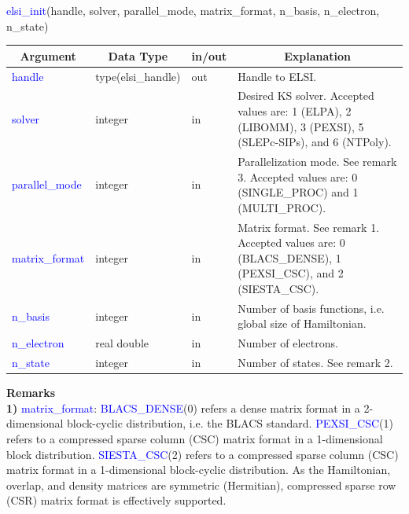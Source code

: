 \documentclass{report}
\begin{document}
\begin{labeling}{\hspace{6cm}}
\item [\hspace{0.3cm} \textcolor{blue}{elsi\_init}(handle, solver, parallel\_mode, matrix\_format, n\_basis, n\_electron, n\_state)]
\end{labeling}

\begin{tabular}[]{|p{30mm}|p{30mm}|p{15mm}|p{90mm}|}
\hline
\multicolumn{1}{|c|}{\textbf{Argument}} & \multicolumn{1}{c|}{\textbf{Data Type}} & \multicolumn{1}{c|}{\textbf{in/out}} & \multicolumn{1}{c|}{\textbf{Explanation}}\\
\hline
\textcolor{blue}{handle}         & type(elsi\_handle) & out & Handle to ELSI.\\
\hline
\textcolor{blue}{solver}         & integer            & in  & Desired KS solver.  Accepted values are:  1 (ELPA), 2 (LIBOMM), 3 (PEXSI), 5 (SLEPc-SIPs), and 6 (NTPoly).\\
\hline
\textcolor{blue}{parallel\_mode} & integer            & in  & Parallelization mode.  See remark 3.  Accepted values are:  0 (SINGLE\_PROC) and 1 (MULTI\_PROC).\\
\hline
\textcolor{blue}{matrix\_format} & integer            & in  & Matrix format.  See remark 1.  Accepted values are:  0 (BLACS\_DENSE), 1 (PEXSI\_CSC), and 2 (SIESTA\_CSC).\\
\hline
\textcolor{blue}{n\_basis}       & integer            & in  & Number of basis functions, i.e. global size of Hamiltonian.\\
\hline
\textcolor{blue}{n\_electron}    & real double        & in  & Number of electrons.\\
\hline
\textcolor{blue}{n\_state}       & integer            & in  & Number of states.  See remark 2.\\
\hline
\end{tabular}

\bigskip
\textbf{Remarks}\\

\textbf{1)} \textcolor{blue}{matrix\_format}:  \textcolor{blue}{BLACS\_DENSE}(0) refers a dense matrix format in a 2-dimensional block-cyclic distribution, i.e. the BLACS standard.  \textcolor{blue}{PEXSI\_CSC}(1) refers to a compressed sparse column (CSC) matrix format in a 1-dimensional block distribution.  \textcolor{blue}{SIESTA\_CSC}(2) refers to a compressed sparse column (CSC) matrix format in a 1-dimensional block-cyclic distribution.  As the Hamiltonian, overlap, and density matrices are symmetric (Hermitian), compressed sparse row (CSR) matrix format is effectively supported.\\
\end{document}
